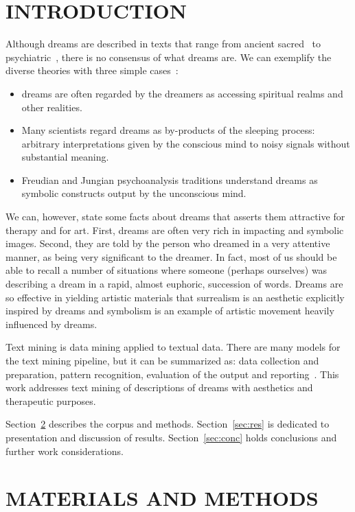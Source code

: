 \documentclass[12pt,fleqn]{article}
\begin{document}
\section{INTRODUCTION}
Although dreams are described in texts that range from ancient sacred~\citep{bible}
to psychiatric~\citep{dreamMed}, there is no consensus of what dreams are.
We can exemplify the diverse theories with three simple cases~\citep{dreamsGen}:
\begin{itemize}
	\item dreams are often regarded by the dreamers as accessing spiritual realms and other realities.
	\item Many scientists regard dreams as by-products of the sleeping process:
		arbitrary interpretations given by the conscious mind to noisy signals without substantial meaning.
	\item Freudian and Jungian psychoanalysis traditions understand dreams as symbolic constructs output by the unconscious mind.
\end{itemize}
\noindent We can, however, state some facts about dreams that asserts them attractive for therapy and for art.
First, dreams are often very rich in impacting and symbolic images.
Second, they are told by the person who dreamed in a very attentive manner, as being very significant to the dreamer.
In fact, most of us should be able to recall a number of situations where someone (perhaps ourselves)
was describing a dream in a rapid, almost euphoric, succession of words.
Dreams are so effective in yielding artistic materials that surrealism is an aesthetic explicitly inspired by dreams and
symbolism is an example of artistic movement heavily influenced by dreams.

Text mining is data mining applied to textual data.
There are many models for the text mining pipeline, but
it can be summarized as: data collection and preparation,
pattern recognition, evaluation of the output and reporting~\citep{tmining}.
This work addresses text mining of descriptions of dreams
with aesthetics and therapeutic purposes.

Section~\ref{sec:matMet} describes the corpus and methods.
Section~\ref{sec:res} is dedicated to presentation and discussion of results.
Section~\ref{sec:conc} holds conclusions and further work considerations.

\section{MATERIALS AND METHODS}\label{sec:matMet}
\end{document}
